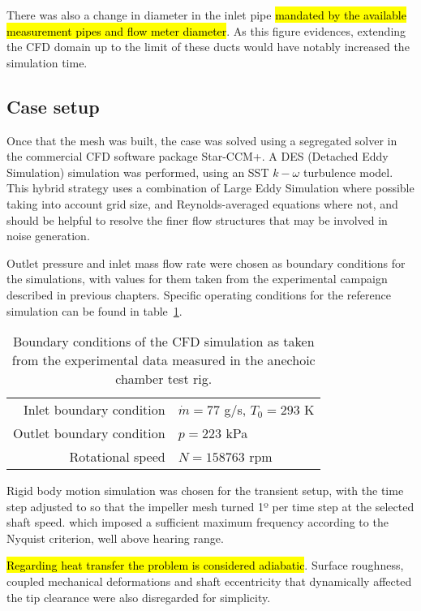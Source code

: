 There was also a change in diameter in the inlet pipe \hl{mandated by the available measurement pipes and flow meter diameter}. As this figure evidences, extending the CFD domain up to the limit of these ducts would have notably increased the simulation time.

\subsection{Case setup}

Once that the mesh was built, the case was solved using a segregated solver in the commercial CFD software package Star-CCM+. A DES (Detached Eddy Simulation) simulation was performed, using an SST $k-\omega$ turbulence model. This hybrid strategy uses a combination of Large Eddy Simulation where possible taking into account grid size, and Reynolds-averaged equations where not, and should be helpful to resolve the finer flow structures that may be involved in noise generation.

Outlet pressure and inlet mass flow rate were chosen as boundary conditions for the simulations, with values for them taken from the experimental campaign described in previous chapters. Specific operating conditions for the reference simulation can be found in table~\ref{tab:operatingConditions}.

\begin{table}
\centering
\caption{Boundary conditions of the CFD simulation as taken from the experimental data measured in the anechoic chamber test rig.}
\footnotesize
\begin{tabular}{rl}
\toprule
Inlet boundary condition & $\dot{m}=77$ g/s, $T_0=293$ K\\
Outlet boundary condition &  $p=223$ kPa \\
Rotational speed & $N=158763$ rpm \\ \bottomrule
\end{tabular}
\label{tab:operatingConditions}
\end{table}

Rigid body motion simulation was chosen for the transient setup, with the time step adjusted to so that the impeller mesh turned 1º per time step at the selected shaft speed. which imposed a sufficient maximum frequency according to the Nyquist criterion, well above hearing range.

\hl{Regarding heat transfer the problem is considered adiabatic}. Surface roughness, coupled mechanical deformations and shaft eccentricity that dynamically affected the tip clearance were also disregarded for simplicity.


